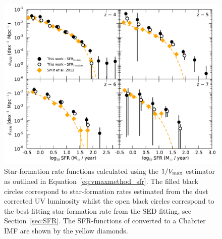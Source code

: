 \begin{figure}
\centering
\includegraphics[width=\textwidth]{plots/fig14.pdf}
\caption[Star-formation rate functions calculated using the $1/V_{\rm{max}}$ estimator as outlined in Equation~\ref{eq:vmaxmethod_sfr}.]{Star-formation rate functions calculated using the $1/V_{\rm{max}}$ estimator as outlined in Equation~\ref{eq:vmaxmethod_sfr}. The filled black circles correspond to star-formation rates estimated from the dust corrected UV luminosity whilst the open black circles correspond to the best-fitting star-formation rate from the SED fitting, see Section~\ref{sec:SFR}. The SFR-functions of \citet{Smit:2012is} converted to a Chabrier IMF are shown by the yellow diamonds.}
\label{fig:sfr_function}
\end{figure}

